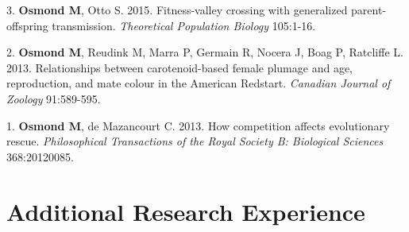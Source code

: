 \documentclass[12pt]{article}
\begin{document}
\noindent\hspace{.1cm}3. \textbf{Osmond M}, Otto S. 2015. Fitness-valley crossing with generalized parent-offspring transmission. \textit{Theoretical Population Biology} 105:1-16. %

\noindent\hspace{.1cm}2. \textbf{Osmond M}, Reudink M, Marra P, Germain R, Nocera J,  Boag P, Ratcliffe L.  2013. Relationships between carotenoid-based female plumage and age, reproduction, and mate colour in the American Redstart. \textit{Canadian Journal of Zoology} 91:589-595. %

\noindent\hspace{.1cm}1. \textbf{Osmond M}, de Mazancourt C. 2013. How competition affects evolutionary rescue. \textit{Philosophical Transactions of the Royal Society B: Biological Sciences} 368:20120085. %

%


\section*{Additional Research Experience}
\end{document}
